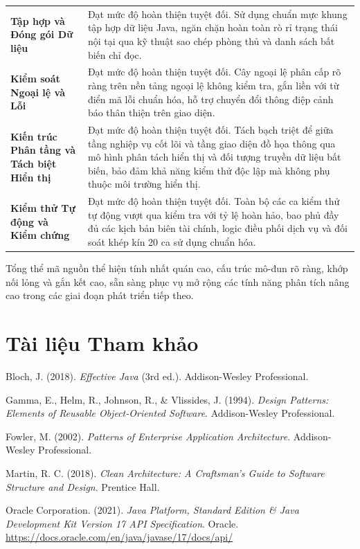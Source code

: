 \documentclass[a4paper,12pt]{report}
\begin{document}
{\begin{longtable}[]{@{}
  >{\raggedright\arraybackslash}p{}
  >{\raggedright\arraybackslash}p{}@{}}
\textbf{Tập hợp và Đóng gói Dữ liệu} & Đạt mức độ hoàn thiện tuyệt đối.
Sử dụng chuẩn mực khung tập hợp dữ liệu Java, ngăn chặn hoàn toàn rò rỉ
trạng thái nội tại qua kỹ thuật sao chép phòng thủ và danh sách bất biến
chỉ đọc. \\
\textbf{Kiểm soát Ngoại lệ và Lỗi} & Đạt mức độ hoàn thiện tuyệt đối.
Cây ngoại lệ phân cấp rõ ràng trên nền tảng ngoại lệ không kiểm tra, gắn
liền với từ điển mã lỗi chuẩn hóa, hỗ trợ chuyển đổi thông điệp cảnh báo
thân thiện trên giao diện. \\
\textbf{Kiến trúc Phân tầng và Tách biệt Hiển thị} & Đạt mức độ hoàn
thiện tuyệt đối. Tách bạch triệt để giữa tầng nghiệp vụ cốt lõi và tầng
giao diện đồ họa thông qua mô hình phân tách hiển thị và đối tượng
truyền dữ liệu bất biến, bảo đảm khả năng kiểm thử độc lập mà không phụ
thuộc môi trường hiển thị. \\
\textbf{Kiểm thử Tự động và Kiểm chứng} & Đạt mức độ hoàn thiện tuyệt
đối. Toàn bộ các ca kiểm thử tự động vượt qua kiểm tra với tỷ lệ hoàn
hảo, bao phủ đầy đủ các kịch bản biên tài chính, logic điều phối dịch vụ
và đối soát khép kín 20 ca sử dụng chuẩn hóa. \\
\end{longtable}
}

Tổng thể mã nguồn thể hiện tính nhất quán cao, cấu trúc mô-đun rõ ràng,
khớp nối lỏng và gắn kết cao, sẵn sàng phục vụ mở rộng các tính năng
phân tích nâng cao trong các giai đoạn phát triển tiếp theo.

\chapter{Tài liệu Tham khảo}\label{tuxe0i-liux1ec7u-tham-khux1ea3o}

Bloch, J. (2018). \emph{Effective Java} (3rd ed.). Addison-Wesley
Professional.

Gamma, E., Helm, R., Johnson, R., \& Vlissides, J. (1994). \emph{Design
Patterns: Elements of Reusable Object-Oriented Software}. Addison-Wesley
Professional.

Fowler, M. (2002). \emph{Patterns of Enterprise Application
Architecture}. Addison-Wesley Professional.

Martin, R. C. (2018). \emph{Clean Architecture: A Craftsman's Guide to
Software Structure and Design}. Prentice Hall.

Oracle Corporation. (2021). \emph{Java Platform, Standard Edition \&
Java Development Kit Version 17 API Specification}. Oracle.
\url{https://docs.oracle.com/en/java/javase/17/docs/api/}
\end{document}
